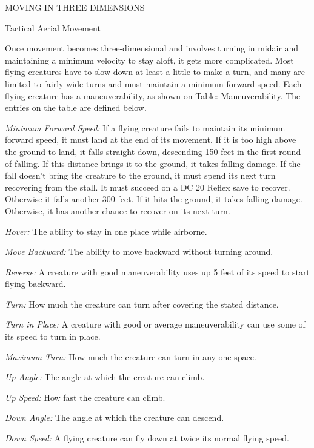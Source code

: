 \documentclass{article}
\begin{document}
\vspace{12pt}
{\large{}MOVING IN THREE DIMENSIONS}

\vspace{12pt}
Tactical Aerial Movement

Once movement becomes three-dimensional and involves turning in midair and maintaining 
a minimum velocity to stay aloft, it gets more complicated. Most flying creatures 
have to slow down at least a little to make a turn, and many are limited to fairly 
wide turns and must maintain a minimum forward speed. Each flying creature has 
a maneuverability, as shown on Table: Maneuverability. The entries on the table 
are defined below.

\textit{Minimum Forward Speed: }If a flying creature fails to maintain its minimum 
forward speed, it must land at the end of its movement. If it is too high above 
the ground to land, it falls straight down, descending 150 feet in the first round 
of falling. If this distance brings it to the ground, it takes falling damage. 
If the fall doesn't bring the creature to the ground, it must spend its next turn 
recovering from the stall. It must succeed on a DC 20 Reflex save to recover. Otherwise 
it falls another 300 feet. If it hits the ground, it takes falling damage. Otherwise, 
it has another chance to recover on its next turn.

\textit{Hover: }The ability to stay in one place while airborne. 

\textit{Move Backward: }The ability to move backward without turning around.

\textit{Reverse: }A creature with good maneuverability uses up 5 feet of its speed 
to start flying backward.

\textit{Turn: }How much the creature can turn after covering the stated distance.

\textit{Turn in Place: }A creature with good or average maneuverability can use 
some of its speed to turn in place.

\textit{Maximum Turn: }How much the creature can turn in any one space. 

\textit{Up Angle: }The angle at which the creature can climb.

\textit{Up Speed: }How fast the creature can climb.

\textit{Down Angle: }The angle at which the creature can descend.

\textit{Down Speed: }A flying creature can fly down at twice its normal flying 
speed.
\end{document}
